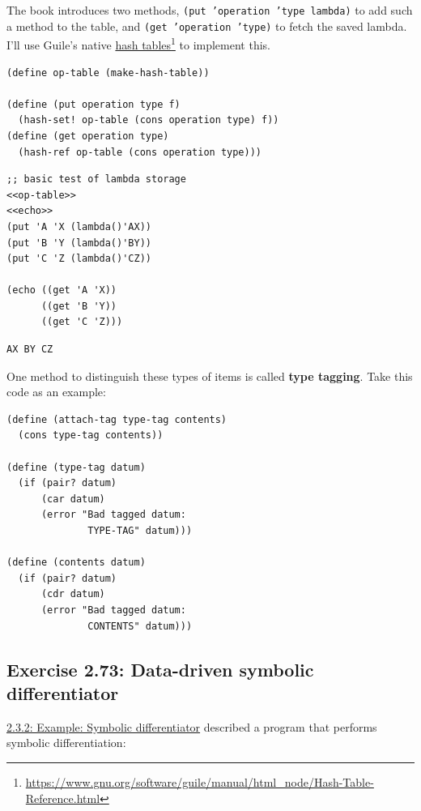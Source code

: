 \documentclass[final,fleqn,titlepage,twoside]{article}
\begin{document}
The book introduces two methods, \texttt{(put 'operation 'type lambda)} to
add such a method to the table, and \texttt{(get 'operation 'type)} to fetch
the saved lambda. I'll use Guile's native \href{https://www.gnu.org/software/guile/manual/html\_node/Hash-Table-Reference.html}{hash tables}\footnote{\url{https://www.gnu.org/software/guile/manual/html\_node/Hash-Table-Reference.html}}
to implement this.

\begin{verbatim}
(define op-table (make-hash-table))

(define (put operation type f)
  (hash-set! op-table (cons operation type) f))
(define (get operation type)
  (hash-ref op-table (cons operation type)))
\end{verbatim}

\begin{verbatim}
;; basic test of lambda storage
<<op-table>>
<<echo>>
(put 'A 'X (lambda()'AX))
(put 'B 'Y (lambda()'BY))
(put 'C 'Z (lambda()'CZ))

(echo ((get 'A 'X))
      ((get 'B 'Y))
      ((get 'C 'Z)))
\end{verbatim}

\begin{verbatim}
AX BY CZ 
\end{verbatim}

One method to distinguish these types of items is called \textbf{type tagging}. Take this code as an example:

\begin{verbatim}
(define (attach-tag type-tag contents)
  (cons type-tag contents))

(define (type-tag datum)
  (if (pair? datum)
      (car datum)
      (error "Bad tagged datum: 
              TYPE-TAG" datum)))

(define (contents datum)
  (if (pair? datum)
      (cdr datum)
      (error "Bad tagged datum: 
              CONTENTS" datum)))
\end{verbatim}

\subsection{Exercise 2.73: Data-driven symbolic differentiator}
\label{sec:org2b532af}
\hyperref[sec:orgd597c64]{2.3.2: Example: Symbolic differentiator} described a program that performs
symbolic differentiation:
\end{document}
